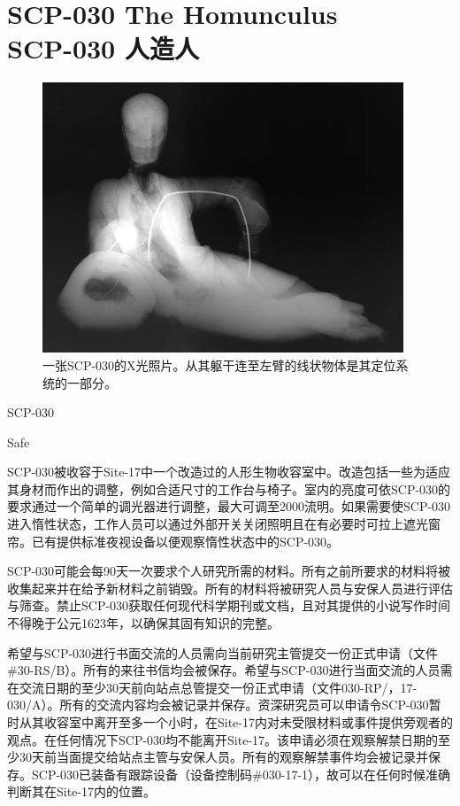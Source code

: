 \chapter[SCP-030 人造人]{
    SCP-030 The Homunculus\\
    SCP-030 人造人
}

\label{chap:SCP-030}

\begin{figure}[H]
    \centering
    \includegraphics[width=0.5\linewidth]{images/SCP.030.jpg}
    \caption*{一张SCP-030的X光照片。从其躯干连至左臂的线状物体是其定位系统的一部分。}
\end{figure}

SCP-030

Safe

SCP-030被收容于Site-17中一个改造过的人形生物收容室中。改造包括一些为适应其身材而作出的调整，例如合适尺寸的工作台与椅子。室内的亮度可依SCP-030的要求通过一个简单的调光器进行调整，最大可调至2000流明。如果需要使SCP-030进入惰性状态，工作人员可以通过外部开关关闭照明且在有必要时可拉上遮光窗帘。已有提供标准夜视设备以便观察惰性状态中的SCP-030。

SCP-030可能会每90天一次要求个人研究所需的材料。所有之前所要求的材料将被收集起来并在给予新材料之前销毁。所有的材料将被研究人员与安保人员进行评估与筛查。禁止SCP-030获取任何现代科学期刊或文档，且对其提供的小说写作时间不得晚于公元1623年，以确保其固有知识的完整。

希望与SCP-030进行书面交流的人员需向当前研究主管提交一份正式申请（文件\#30-RS\slash B）。所有的来往书信均会被保存。希望与SCP-030进行当面交流的人员需在交流日期的至少30天前向站点总管提交一份正式申请（文件030-RP\slash ，17-030\slash A）。所有的交流内容均会被记录并保存。资深研究员可以申请令SCP-030暂时从其收容室中离开至多一个小时，在Site-17内对未受限材料或事件提供旁观者的观点。在任何情况下SCP-030均不能离开Site-17。该申请必须在观察解禁日期的至少30天前当面提交给站点主管与安保人员。所有的观察解禁事件均会被记录并保存。SCP-030已装备有跟踪设备（设备控制码\#030-17-1），故可以在任何时候准确判断其在Site-17内的位置。

